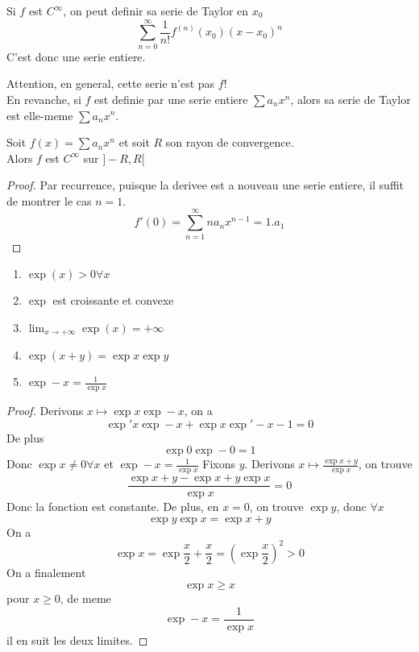 \documentclass[../main.tex]{subfiles}
\begin{document}
\begin{rmq}
Si $f$ est $C^{ \infty }$, on peut definir sa serie de Taylor en $x_0$ 
\[ 
	\sum_{n=0}^{ \infty }\frac{1}{n!} f^{( n) }( x_0) ( x-x_0)^{n}
\]
C'est donc une serie entiere.
\end{rmq}
Attention, en general, cette serie n'est pas $f$!\\
En revanche, si $f$ est definie par une serie entiere $ \sum a_n x^{n}$, alors sa serie de Taylor est elle-meme $\sum a_n x^{n}$.
\begin{crly}
	Soit $f( x) = \sum a_n x^{n}$ et soit $R$ son rayon de convergence.\\
	Alors $f$ est $C^{ \infty }$ sur $]-R,R[$
\end{crly}
\begin{proof}
Par recurrence, puisque la derivee est a nouveau une serie entiere, il suffit de montrer le cas $n=1$.\\
\[ 
	f'( 0) = \sum_{n=1}^{ \infty }n a_n x^{n-1} = 1. a_1
\]

\end{proof}
\begin{propo}
\begin{enumerate}
	\item $\exp( x) > 0 \forall x$ 
	\item $\exp$ est croissante et convexe
	\item $ \lim_{x \to  + \infty} \exp( x) = + \infty $ 
	\item $\exp( x+y) = \exp x \exp y$
	\item $\exp -x = \frac{1}{\exp x}$
\end{enumerate}

\end{propo}
\begin{proof}
Derivons $x \mapsto \exp x \exp -x$, on a 
\[ 
	\exp' x \exp -x + \exp x \exp' -x -1 = 0
\]
De plus 
\[ 
\exp 0 \exp -0 = 1
\]
Donc $\exp x \neq 0 \forall x$ et $\exp -x = \frac{1}{\exp x}$
Fixons $y$. Derivons $x \mapsto \frac{\exp x+y}{\exp x}$, on trouve
\[ 
\frac{\exp x+y- \exp x+y \exp x}{\exp x} =0
\]
Donc la fonction est constante. De plus, en  $x=0$, on trouve $\exp y$, donc $\forall x $ 
\[ 
\exp y \exp x = \exp x+y
\]
On a 
\[ 
\exp x = \exp \frac{x}{2} + \frac{x}{2} = \left( \exp \frac{x}{2}  \right)^{2} > 0
\]
On a finalement
\[ 
\exp x \geq x
\]
pour $x\geq 0$, de meme
\[ 
\exp -x = \frac{1}{\exp x}
\]
il en suit les deux limites.




\end{proof}
\end{document}
